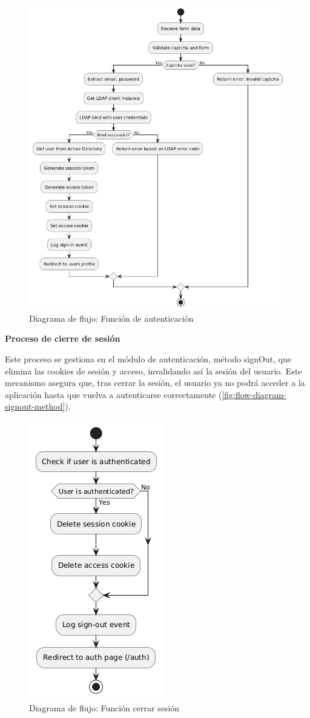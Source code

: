 \begin{figure}[H]
    \centering
    \includegraphics[scale=0.5]{images/puml/flow-diagram-signin/flow-diagram-signin.png}
    \caption{Diagrama de flujo: Función de autenticación}
    \label{fig:flow-diagram-auth-method}
\end{figure}

\textbf{Proceso de cierre de sesión}

Este proceso se gestiona en el módulo de autenticación, método signOut, que elimina las cookies de sesión y acceso, invalidando así la sesión del usuario. Este mecanismo asegura que, tras cerrar la sesión, el usuario ya no podrá acceder a la aplicación hasta que vuelva a autenticarse correctamente (\autoref{fig:flow-diagram-signout-method}).

\begin{figure}[H]
    \centering
    \includegraphics[scale=0.6]{images/puml/flow-diagram-signout/flow-diagram signout.png}
    \caption{Diagrama de flujo: Función cerrar sesión}
    \label{fig:flow-diagram-signout-method}
\end{figure}